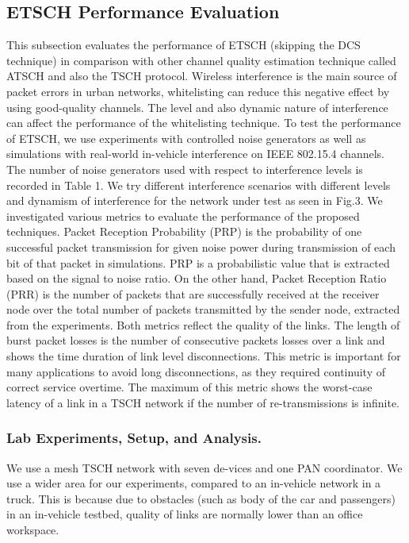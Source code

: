 \documentclass[acmsmall, authorversion]{acmart}
\begin{document}
\subsection{ETSCH Performance Evaluation}
This subsection evaluates the performance of ETSCH (skipping the DCS technique) in comparison with other channel quality estimation technique called ATSCH and also the TSCH protocol. Wireless interference is the main source of packet errors in urban networks, whitelisting can reduce this negative effect by using good-quality channels. The level and also dynamic nature of interference can affect the performance of the whitelisting technique. To test the performance of ETSCH, we use experiments with controlled noise generators as well as simulations with real-world in-vehicle interference on IEEE 802.15.4 channels. The number of noise generators used with respect to interference levels is recorded in Table 1. We try different interference scenarios with different levels and dynamism of interference for the network under test as seen in Fig.3. We investigated various metrics to evaluate the performance of the proposed techniques. Packet Reception Probability (PRP) is the probability of one successful packet transmission for given noise power during transmission of each bit of that packet in simulations. PRP is a probabilistic value that is extracted based on the signal to noise ratio. On the other hand, Packet Reception Ratio (PRR) is the number of packets that are successfully received at the receiver node over the total number of packets transmitted by the sender node, extracted from the experiments. Both metrics reflect the quality of the links. The length of burst packet losses is the number of consecutive packets losses over a link and shows the time duration of link level disconnections. This metric is important for many applications to avoid long disconnections, as they required continuity of correct service overtime. The maximum of this metric shows the worst-case latency of a link in a TSCH network if the number of re-transmissions is infinite. 

\subsubsection{Lab Experiments, Setup, and Analysis.}
We use a mesh TSCH network with seven de-vices and one PAN coordinator. We use a wider area for our experiments, compared to an in-vehicle network in a truck. This is because due to obstacles (such as body of the car and passengers) in an in-vehicle testbed, quality of links are normally lower than an office workspace. 
\end{document}
